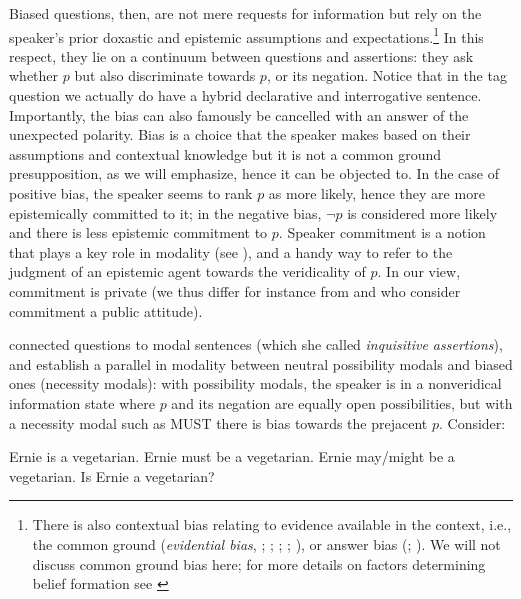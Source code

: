 \documentclass[output=paper,colorlinks,citecolor=brown]{langscibook}
\begin{document}
Biased questions, then,  are not mere requests for information but rely on the speaker's prior doxastic and epistemic assumptions and expectations.\footnote{There is also contextual bias relating to evidence available in the context, i.e., the common ground (\textit{evidential bias}, \citealt{buring2000}; \citealt{romero2004}; \citealt{sudo2013}; \citealt{northrup2014}; \citealt{domaneschi2017}), or answer bias (\citealt{krifka2015SALT}; \citealt{malamud2015}). We will not discuss common ground bias here; for more details on factors determining belief formation see \citet{giannakidoumari2021a, giannakidoumari2021b}}  In this respect, they lie on a continuum between questions and assertions: they ask whether $p$ but also discriminate towards  $p$, or its negation. Notice that in the tag question  we actually do have a hybrid declarative and interrogative sentence.   Importantly, the bias can also famously be cancelled with an answer of the unexpected polarity. Bias is a choice that the speaker makes based on their assumptions and contextual knowledge but it is not a common ground presupposition, as we will emphasize, hence it can be objected to. In the case of positive bias, the speaker seems to rank $p$ as more likely,  hence they are more epistemically committed to it;  in the negative bias, $\neg p$ is considered more likely and there is less epistemic commitment to $p$.  Speaker commitment  is a notion  that plays a key role in modality (see \citealt{giannakidoumari2021a}),  and a handy way to refer to the judgment of an epistemic agent towards the veridicality of $p$. In our view, commitment is private (we thus differ for instance from \citealt{krifka2015SALT} and \citealt{geurts2019} who consider commitment a public attitude).


%
\citet{giannakidou2013} connected questions to modal sentences (which she call\-ed \textit{inquisitive assertions}), and \citet{giannakidoumari2018b, giannakidoumari2021a, giannakidoumari2021b} establish a parallel in modality between neutral possibility modals and biased ones (necessity modals):  with possibility modals, the speaker is in a nonveridical information state where $p$ and its negation are equally open possibilities, but with a necessity modal such as \textsc{MUST} there is bias towards the prejacent $p$. Consider:

\ea 
\ea Ernie is a vegetarian. 
\ex Ernie must be a vegetarian.
\ex Ernie may/might be a vegetarian. 
\ex Is Ernie a vegetarian?
\z
\z
\end{document}
